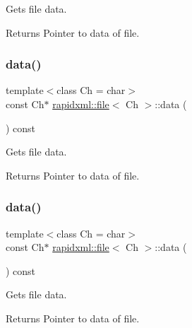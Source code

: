 Gets file data. \begin{DoxyReturn}{Returns}
Pointer to data of file. 
\end{DoxyReturn}
\mbox{\label{classrapidxml_1_1file_a044bdd99e59157b8a5a1b28c2f32da4d}} 
\subsubsection{\texorpdfstring{data()}{data()}\hspace{0.1cm}{\footnotesize\ttfamily [3/4]}}
{\footnotesize\ttfamily template$<$class Ch  = char$>$ \\
const Ch$\ast$ \mbox{\hyperlink{classrapidxml_1_1file}{rapidxml\+::file}}$<$ Ch $>$\+::data (\begin{DoxyParamCaption}{ }\end{DoxyParamCaption}) const\hspace{0.3cm}{\ttfamily [inline]}}

Gets file data. \begin{DoxyReturn}{Returns}
Pointer to data of file. 
\end{DoxyReturn}
\mbox{\label{classrapidxml_1_1file_a044bdd99e59157b8a5a1b28c2f32da4d}} 
\subsubsection{\texorpdfstring{data()}{data()}\hspace{0.1cm}{\footnotesize\ttfamily [4/4]}}
{\footnotesize\ttfamily template$<$class Ch  = char$>$ \\
const Ch$\ast$ \mbox{\hyperlink{classrapidxml_1_1file}{rapidxml\+::file}}$<$ Ch $>$\+::data (\begin{DoxyParamCaption}{ }\end{DoxyParamCaption}) const\hspace{0.3cm}{\ttfamily [inline]}}

Gets file data. \begin{DoxyReturn}{Returns}
Pointer to data of file. 
\end{DoxyReturn}
\mbox{\label{classrapidxml_1_1file_aacd451b3def3ad056fe8342dccee35cd}} 
